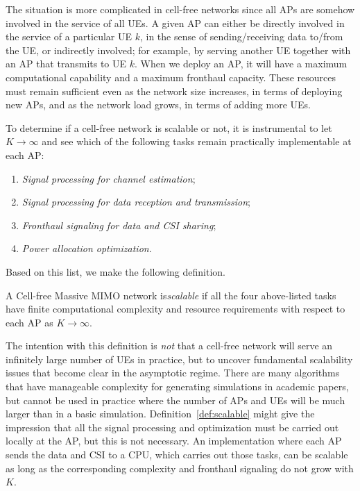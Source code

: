 The situation is more complicated in cell-free networks since all APs are somehow involved in the service of all UEs. A given AP can either be directly involved in the service of a particular UE $k$, in the sense of sending/receiving data to/from the UE, or indirectly involved; for example, by serving another UE together with an AP that transmits to UE $k$. When we deploy an AP, it will have a maximum computational capability and a maximum fronthaul capacity. These resources must remain sufficient even as the network size increases, in terms of deploying new APs, and as the network load grows, in terms of adding more UEs.

To determine if a cell-free network is scalable or not, it is instrumental to let $K \to \infty$ and see which of the following tasks remain practically implementable at each AP:
\begin{enumerate}
\item \emph{Signal processing for channel estimation};
\item\emph{Signal processing for data reception and transmission};
\item \emph{Fronthaul signaling for data and \gls{CSI} sharing};
\item \emph{Power allocation optimization}.
\end{enumerate}

Based on this list, we make the following definition.

\begin{definition}[Scalability] \label{def:scalable}
A Cell-free Massive MIMO network is\linebreak \emph{scalable} if all the four above-listed tasks have finite computational complexity and resource requirements with respect to each AP as $K \to \infty$.
\end{definition}

\enlargethispage{0.5\baselineskip} 

The intention with this definition is \emph{not} that a cell-free network will serve an infinitely large number of UEs in practice, but to uncover fundamental scalability issues that become clear in the asymptotic regime. There are many algorithms that have manageable complexity for generating simulations in academic papers, but cannot be used in practice where the number of APs and UEs will be much larger than in a basic simulation. Definition~\ref{def:scalable} might give the impression that all the signal processing and optimization must be carried out locally at the AP, but this is not necessary. An implementation where each AP sends the data and CSI to a CPU, which carries out those tasks, can be scalable as long as the corresponding complexity and fronthaul signaling do not grow with $K$.

